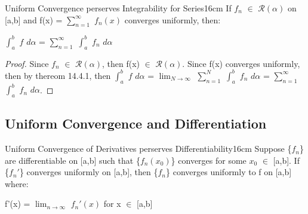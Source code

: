     \vspace{0.5cm}


    \begin{wtheorem}{Uniform Convergence perserves Integrability for Series}{16cm}
        If $f_n$ $\in$ $\mathscr{R}(\alpha)$ on [a,b] and
        f(x) = $\sum_{n=1}^{\infty}$ $f_n(x)$ converges uniformly, then:

        \hspace{0.5cm}
        $\int_a^b$ $f$ $d\alpha$ = $\sum_{n=1}^{\infty}$ $\int_a^b$ $f_n$ $d\alpha$
    \end{wtheorem}

    \begin{proof}
        Since $f_n$ $\in$ $\mathscr{R}(\alpha)$, then
        f(x) $\in$ $\mathscr{R}(\alpha)$. Since f(x) converges uniformly, then
        by {\color{red} thereom 14.4.1}, then
        $\int_a^b$ $f$ $d\alpha$
        = $\lim_{N \rightarrow \infty}$ $\sum_{n=1}^{N}$ $\int_a^b$ $f_n$ $d\alpha$
        = $\sum_{n=1}^{\infty}$ $\int_a^b$ $f_n$ $d\alpha$.
    \end{proof}

    \newpage





\subsection[ Differentiation ]{ Uniform Convergence and Differentiation }

    \begin{wtheorem}{Uniform Convergence of Derivatives
    perserves Differentiability}{16cm}
        Suppose \{$f_n$\} are differentiable on [a,b] such that
        \{$f_n(x_0)$\} converges for some $x_0$ $\in$ [a,b]. If
        \{$f_n'$\} converges uniformly on [a,b], then \{$f_n$\}
        converges uniformly to f on [a,b] where:

        \hspace{0.5cm}
        f'(x) = $\lim_{n \rightarrow \infty}$ $f_n'(x)$
        \hspace{1cm}
        for x $\in$ [a,b]
    \end{wtheorem}

